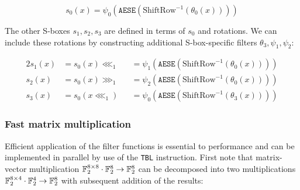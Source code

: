 \[
    s_0(x)=\psi_0(\texttt{AESE}(\text{ShiftRow}^{-1}(\theta_0(x))))
\]

The other S-boxes $s_1,s_2,s_3$ are defined in terms of $s_0$ and rotations. We
can include these rotations by constructing additional S-box-specific filters
$\theta_3,\psi_1,\psi_2$:

\begin{alignat*}{2}
    s_1(x)&=s_0(x)\lll_1&&=\psi_1(\texttt{AESE}(\text{ShiftRow}^{-1}(\theta_0(x)))) \\
    s_2(x)&=s_0(x)\ggg_1&&=\psi_2(\texttt{AESE}(\text{ShiftRow}^{-1}(\theta_0(x)))) \\
    s_3(x)&=s_0(x\lll_1)&&=\psi_0(\texttt{AESE}(\text{ShiftRow}^{-1}(\theta_3(x))))
\end{alignat*}

\subsubsection{Fast matrix multiplication}

Efficient application of the filter functions is essential to performance and
can be implemented in parallel by use of the \texttt{TBL} instruction. First
note that matrix-vector multiplication $\mathbb{F}_2^{8\times 8}\cdot\mathbb{F}_2^{8}\rightarrow
\mathbb{F}_2^{8}$ can be decomposed into two multiplications $\mathbb{F}_2^{8\times
4}\cdot\mathbb{F}_2^{4}\rightarrow \mathbb{F}_2^{8}$ with subsequent addition of the results:

